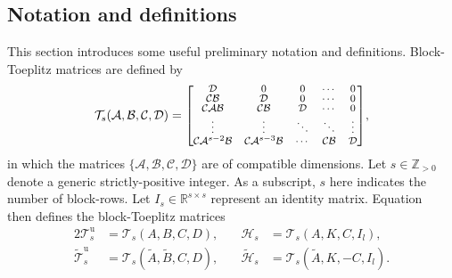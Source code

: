 \subsection{Notation and definitions}\label{sec:notation}
\noindent This section introduces some useful preliminary notation and definitions.
%
Block-Toeplitz matrices are defined by
\begin{align}\label{eqn:blockToeplitz} 
\mathcal{T}_s(\mathcal{A},\mathcal{B},\mathcal{C},\mathcal{D}) =\scriptsize{
	\begingroup
    \renewcommand*{\arraystretch}{0.8}
    \begin{bmatrix}
		\mathcal{D}         & 0         & 0      & \cdots  & 0\\
		\mathcal{C}\mathcal{B}        & \mathcal{D}         & 0      & \cdots  & 0\\
		\mathcal{C}\mathcal{A}\mathcal{B}       & \mathcal{C}\mathcal{B}        & \mathcal{D}      & \cdots & 0\\
		\vdots    &  \vdots & \ddots & \ddots & \vdots\\
		\mathcal{C}\mathcal{A}^{s-2}\mathcal{B} & \mathcal{C}\mathcal{A}^{s-3}\mathcal{B} & \cdots  & \mathcal{C}\mathcal{B}     & \mathcal{D}
	\end{bmatrix}
    \endgroup},
\end{align}
in which the matrices $\{\mathcal{A},\mathcal{B},\mathcal{C},\mathcal{D}\}$ are of compatible dimensions. Let $s\in\mathbb{Z}_{>0}$ denote a generic strictly-positive integer. As a subscript, $s$ here indicates the number of block-rows. Let ${I_s\in\mathbb{R}^{s\times s}}$ represent an identity matrix. Equation~ then defines the block-Toeplitz matrices
\begin{alignat*}{2}
\mathcal{T}_s^\mathrm{u}&=\mathcal{T}_s(A,B,C,D),\quad  &\mathcal{H}_s&=\mathcal{T}_s(A,K,C,I_l),\\
\widetilde{\mathcal{T}}_s^\mathrm{u}&=\mathcal{T}_s(\tilde{A},\tilde{B},C,D),\quad  &\widetilde{\mathcal{H}}_s&=\mathcal{T}_s(\tilde{A},K,-C,I_l).
\end{alignat*}

